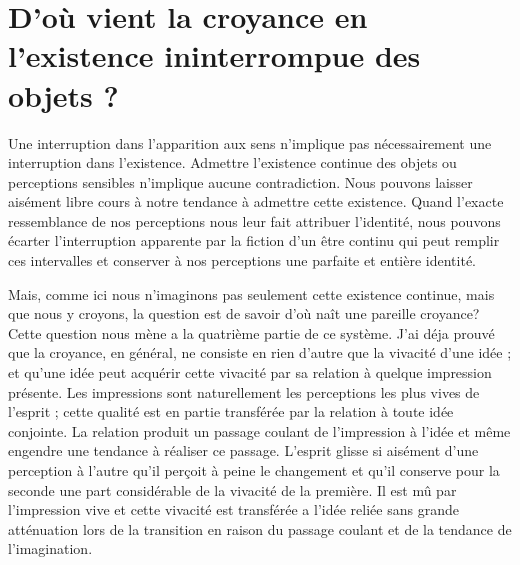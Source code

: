 
\section{D'où vient la croyance en l'existence ininterrompue des objets ?}

Une interruption dans l’apparition aux sens n’implique
pas nécessairement une interruption dans l'existence.
Admettre l’existence continue des objets ou perceptions
sensibles n’implique aucune contradiction. Nous pouvons
laisser aisément libre cours à notre tendance à admettre
cette existence. Quand l'exacte ressemblance de nos
perceptions nous leur fait attribuer l’identité, nous pouvons
écarter l’interruption apparente par la fiction d’un
être continu qui peut remplir ces intervalles et conserver
à nos perceptions une parfaite et entière identité.

Mais, comme ici nous n’imaginons pas seulement cette
existence continue, mais que nous y croyons, la question
est de savoir d’où naît une pareille croyance? Cette
question nous mène a la quatrième partie de ce système.
J’ai déja prouvé que la croyance, en général, ne consiste
en rien d’autre que la vivacité d’une idée ; et qu’une idée
peut acquérir cette vivacité par sa relation à quelque
impression présente. Les impressions sont naturellement
les perceptions les plus vives de l’esprit ; cette qualité est
en partie transférée par la relation à toute idée conjointe.
La relation produit un passage coulant de l’impression à
l'idée et même engendre une tendance à réaliser ce passage.
L’esprit glisse si aisément d’une perception à l’autre
qu’il perçoit à peine le changement et qu’il conserve pour
la seconde une part considérable de la vivacité de la
première. Il est mû par l’impression vive et cette vivacité
est transférée a l’idée reliée sans grande atténuation lors
de la transition en raison du passage coulant et de la
tendance de l’imagination.


